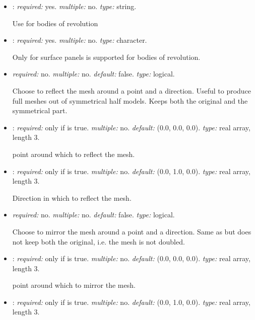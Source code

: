 \begin{itemize}

\item {}: \textit{required:} yes. \textit{multiple:} no. \textit{type:} string. 

Use  for bodies of revolution

\item {}: \textit{required:} yes. \textit{multiple:} no. \textit{type:} character.

    Only  for surface panels is supported for bodies of revolution.

\item {} \textit{required:} no. \textit{multiple:} no. \textit{default:} false. \textit{type:} logical.

Choose to reflect the mesh around a point and a direction. Useful to produce full meshes out of symmetrical half models. Keeps both the original and the symmetrical part. 

\item {}: \textit{required:} only if  is true. \textit{multiple:} no. \textit{default:} (0.0, 0.0, 0.0). \textit{type:} real array, length 3.

point around which to reflect the mesh.

\item {}: \textit{required:} only if  is true. \textit{multiple:} no. \textit{default:} (0.0, 1.0, 0.0). \textit{type:} real array, length 3.

Direction in which to reflect the mesh.

\item {} \textit{required:} no. \textit{multiple:} no. \textit{default:} false. \textit{type:} logical.

Choose to mirror the mesh around a point and a direction. Same as  but does not keep both the original, i.e. the mesh is not doubled.

\item {}: \textit{required:} only if  is true. \textit{multiple:} no. \textit{default:} (0.0, 0.0, 0.0). \textit{type:} real array, length 3.

point around which to mirror the mesh.

\item {}: \textit{required:} only if  is true. \textit{multiple:} no. \textit{default:} (0.0, 1.0, 0.0). \textit{type:} real array, length 3.


\end{itemize}
